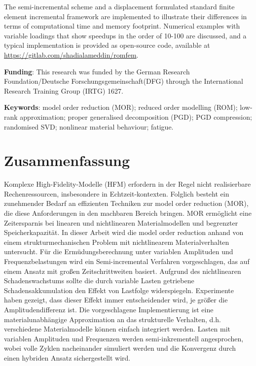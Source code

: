 The semi-incremental scheme and a displacement formulated standard finite element incremental framework are implemented to illustrate their differences in terms of computational time and memory footprint. Numerical examples with variable loadings that show speedups in the order of 10-100 are discussed, and a typical implementation is provided as open-source code, available at \url{https://gitlab.com/shadialameddin/romfem}.

\textbf{Funding}: This research was funded by the German Research Foundation/Deutsche Forschungsgemeinschaft(DFG) through the International Research Training Group (IRTG) 1627.

\textbf{Keywords}: model order reduction (MOR); reduced order modelling (ROM); low-rank approximation; proper generalised decomposition (PGD); PGD compression; randomised SVD; nonlinear material behaviour; fatigue.


\chapter*{Zusammenfassung}

Komplexe High-Fidelity-Modelle (HFM) erfordern in der Regel nicht realisierbare Rechenressourcen, insbesondere in Echtzeit-kontexten. Folglich besteht ein zunehmender Bedarf an effizienten Techniken zur model order reduction (MOR), die diese Anforderungen in den machbaren Bereich bringen. MOR ermöglicht eine Zeitersparnis bei linearen und nichtlinearen Materialmodellen und begrenzter Speicherkapazität. In dieser Arbeit wird die model order reduction anhand von einem strukturmechanischen Problem mit nichtlinearem Materialverhalten untersucht. Für die Ermüdungsberechnung unter variablen Amplituden und Frequenzbelastungen wird ein Semi-incremental Verfahren vorgeschlagen, das auf einem Ansatz mit großen Zeitschrittweiten basiert. Aufgrund des nichtlinearen Schadenswachstums sollte die durch variable Lasten getriebene Schadensakkumulation den Effekt von Lastfolge widerspiegeln. Experimente haben gezeigt, dass dieser Effekt immer entscheidender wird, je größer die Amplitudendifferenz ist. Die vorgeschlagene Implementierung ist eine materialunabhängige Approximation an das strukturelle Verhalten, d.h. verschiedene Materialmodelle können einfach integriert werden. Lasten mit variablen Amplituden und Frequenzen werden semi-inkrementell angesprochen, wobei volle Zyklen nacheinander simuliert werden und die Konvergenz durch einen hybriden Ansatz sichergestellt wird.

